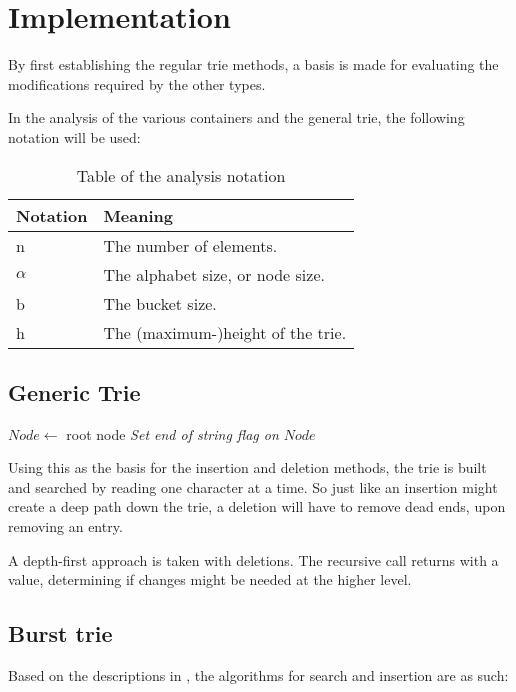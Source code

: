 \chapter{Implementation}
By first establishing the regular trie methods, a basis is made for evaluating
the modifications required by the other types.

In the analysis of the various containers and the general trie, the following
notation will be used:
\begin{table}[h!]
    \centering
    \begin{tabular}[here]{ l l}
        Notation & Meaning \\ \hline
        n       & The number of elements.\\
        $\alpha$& The alphabet size, or node size.\\
        b       & The bucket size.\\
        h       & The (maximum-)height of the trie. \\
    \end{tabular}
    \caption{Table of the analysis notation}
    \label{tab:notation}
\end{table}

\section{Generic Trie}

\begin{algorithm}[H]
    \caption{$k$\FuncSty{)}}
    $Node \leftarrow$  root node\;
    \emph{Set end of string flag on $Node$}\;
\end{algorithm}
Using this as the basis for the insertion and deletion methods, the trie is
built and searched by reading one character at a time. So just like an
insertion might create a deep path down the trie, a deletion will have to
remove dead ends, upon removing an entry.

A depth-first approach is taken with deletions. The recursive call returns with
a value, determining if changes might be needed at the higher level.





\section{Burst trie}
Based on the descriptions in \cite{Nash:2008}, the algorithms for search
and insertion are as such:

